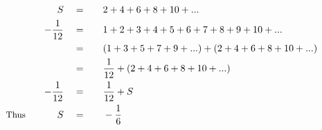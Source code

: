 \begin{alignat*}{5}
&\,&S\quad&=\quad&&2+4+6+8+10+...\\
&\,&-\frac{1}{12}\quad&=&&1+2+3+4+5+6+7+8+9+10+...\\
&\,&\,&=&&(1+3+5+7+9+...)+(2+4+6+8+10+...)\\
&\,&\,&=&&\frac{1}{12}+(2+4+6+8+10+...)\\
&\,&-\frac{1}{12}\quad&=&&\frac{1}{12}+S\\
&\small\text{Thus}\quad&S\quad&=&&-\frac{1}{6}
\end{alignat*}

